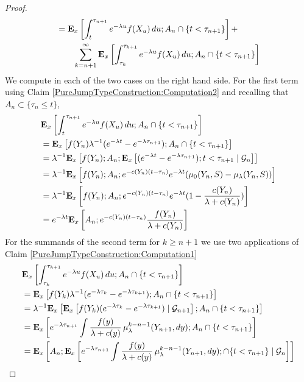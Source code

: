 \begin{proof}
\begin{align*}
&= \sexpectation{\int_t^{\tau_{n+1}}  e^{-\lambda u} f(X_u) \, du ; A_n \cap \lbrace t < \tau_{n+1} \rbrace}{x} + \\
&\qquad \sum_{k=n+1}^\infty \sexpectation{\int_{\tau_k}^{\tau_{k+1}}  e^{-\lambda u} f(X_u) \, du ; A_n \cap \lbrace t < \tau_{n+1} \rbrace}{x}
\end{align*}
We compute in each of the two cases on the right hand side.  For the first term using Claim \ref{PureJumpTypeConstruction:Computation2} and recalling that $A_n \subset \lbrace \tau_n \leq t \rbrace$,
\begin{align*}
&\sexpectation{\int_t^{\tau_{n+1}}  e^{-\lambda u} f(X_u) \, du ; A_n \cap \lbrace t < \tau_{n+1} \rbrace}{x} \\
&=\sexpectation{ f(Y_n) \lambda^{-1} (e^{-\lambda t} - e^{-\lambda \tau_{n+1}}) ; A_n \cap \lbrace t < \tau_{n+1} \rbrace}{x} \\
&=\lambda^{-1}\sexpectation{ f(Y_n) ; A_n ; \csexpectationlong{\mathcal{G}_n}{(e^{-\lambda t} - e^{-\lambda \tau_{n+1}}) ; t < \tau_{n+1}}{x}}{x} \\
&=\lambda^{-1}\sexpectation{ f(Y_n) ; A_n ; e^{-c(Y_n)(t - \tau_{n})} e^{-\lambda t} (\mu_0(Y_n, S) - \mu_\lambda(Y_n, S))}{x} \\
&=\lambda^{-1}\sexpectation{ f(Y_n) ; A_n ; e^{-c(Y_n)(t - \tau_{n})} e^{-\lambda t} (1 -\frac{c(Y_n)}{\lambda + c(Y_n)})}{x} \\
&=e^{-\lambda t} \sexpectation{ A_n ; e^{-c(Y_n)(t - \tau_{n})} \frac{f(Y_n)}{\lambda + c(Y_n)}}{x} \\
\end{align*}
For the summands of the second term for $k \geq n+1$ we use two applications of Claim \ref{PureJumpTypeConstruction:Computation1}
\begin{align*}
&\sexpectation{\int_{\tau_k}^{\tau_{k+1}}  e^{-\lambda u} f(X_u) \, du ; A_n \cap \lbrace t < \tau_{n+1} \rbrace}{x} \\
&=\sexpectation{ f(Y_k) \lambda^{-1} (e^{-\lambda \tau_k} - e^{-\lambda \tau_{k+1}}) ; A_n \cap \lbrace t < \tau_{n+1} \rbrace}{x} \\
&=\lambda^{-1} \sexpectation{ \csexpectationlong{\mathcal{G}_{n+1}}{f(Y_k) (e^{-\lambda \tau_k} - e^{-\lambda \tau_{k+1}})}{x} ; A_n \cap \lbrace t < \tau_{n+1} \rbrace}{x} \\
&=\sexpectation{ e^{-\lambda \tau_{n+1}} \int \frac{f(y)}{\lambda + c(y)} \,  \mu^{k-n-1}_\lambda(Y_{n+1}, dy)  ; A_n \cap \lbrace t < \tau_{n+1} \rbrace}{x} \\
&=\sexpectation{ A_n ; \csexpectationlong{\mathcal{G}_{n}} {e^{-\lambda \tau_{n+1}} \int \frac{f(y)}{\lambda + c(y)} \,  \mu^{k-n-1}_\lambda(Y_{n+1}, dy) ;\cap \lbrace t < \tau_{n+1} \rbrace}{x}}{x} \\

\end{align*}
\end{proof}
